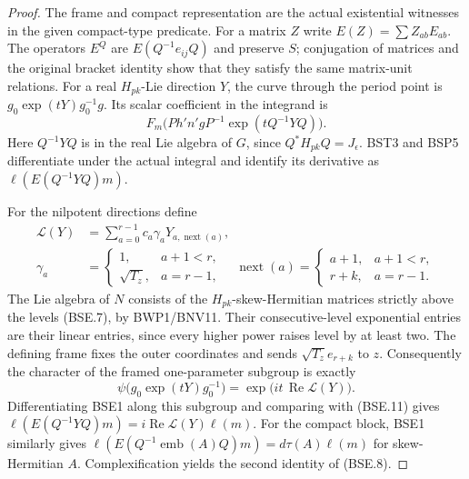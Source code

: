 \documentclass[11pt,a4paper]{article}
\numberwithin{equation}{section}
\theoremstyle{remark}\newtheorem{remark}[theorem]{Remark}
\begin{document}
\begin{proof}
The frame and compact representation are the actual existential
witnesses in the given compact-type predicate.
For a matrix $Z$ write $E(Z)=\sum Z_{ab}E_{ab}$.
The operators $E^Q$ are $E(Q^{-1}e_{ij}Q)$ and preserve $S$;
conjugation of matrices and the original bracket identity show that
they satisfy the same matrix-unit relations.
For a real $H_{pk}$-Lie direction $Y$, the curve through the period
point is $g_0\exp(tY)g_0^{-1}g$.
Its scalar coefficient in the integrand is
\[
 F_m\bigl(P h'n'gP^{-1}\exp(tQ^{-1}YQ)\bigr).
 \tag{BSE.11}
\]
Here $Q^{-1}YQ$ is in the real Lie algebra of $G$, since
$Q^*H_{pk}Q=J_\epsilon$.
BST3 and BSP5 differentiate under the actual integral and identify
its derivative as $\ell(E(Q^{-1}YQ)m)$.

For the nilpotent directions define
\[
 \begin{split}
 \mathcal L(Y)&=\sum_{a=0}^{r-1}c_a\gamma_aY_{a,\operatorname{next}(a)},\\
 \gamma_a&=\begin{cases}1,&a+1<r,\\\sqrt{T_z},&a=r-1,\end{cases}
 \quad
 \operatorname{next}(a)=
       \begin{cases}a+1,&a+1<r,\\r+k,&a=r-1.\end{cases}
 \end{split}
 \tag{BSE.12}
\]
The Lie algebra of $N$ consists of the $H_{pk}$-skew-Hermitian
matrices strictly above the levels (BSE.7), by BWP1/BNV11.
Their consecutive-level exponential entries are their linear
entries, since every higher power raises level by at least two.
The defining frame fixes the outer coordinates and sends
$\sqrt{T_z}e_{r+k}$ to $z$.  Consequently the character of the
framed one-parameter subgroup is exactly
\[
 \psi\bigl(g_0\exp(tY)g_0^{-1}\bigr)
                         =\exp\bigl(it\,\operatorname{Re}\mathcal L(Y)\bigr).
 \tag{BSE.13}
\]
Differentiating BSE1 along this subgroup and comparing with
(BSE.11) gives
$\ell(E(Q^{-1}YQ)m)=i\operatorname{Re}\mathcal L(Y)\ell(m)$.
For the compact block, BSE1 similarly gives
$\ell(E(Q^{-1}\operatorname{emb}(A)Q)m)=d\tau(A)\ell(m)$
for skew-Hermitian $A$.  Complexification yields the second
identity of (BSE.8).


\end{proof}
\end{document}
